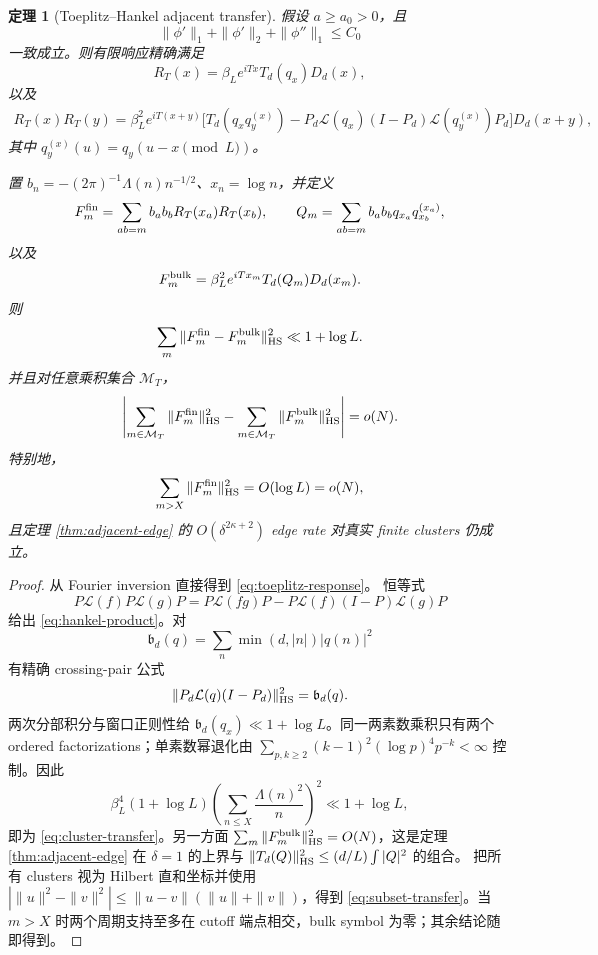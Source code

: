 \documentclass[UTF8,11pt,a4paper]{ctexart}
\newtheorem{theorem}{定理}[section]
\theoremstyle{definition}
\theoremstyle{remark}
\begin{document}
\begin{theorem}[Toeplitz--Hankel adjacent transfer]
\label{thm:toeplitz-adjacent}
假设 $a\ge a_0>0$，且
\[
 \|\phi'\|_1+\|\phi'\|_2+\|\phi''\|_1\le C_0
\]
一致成立。则有限响应精确满足
\[
 R_T(x)=\beta_Le^{iTx}T_d(q_x)D_d(x),
 \label{eq:toeplitz-response}
\]
以及
\[
 \begin{aligned}
 R_T(x)R_T(y)
 =\beta_L^2e^{iT(x+y)}
 \bigl[T_d(q_xq_y^{(x)})
 -P_d\mathcal L(q_x)(I-P_d)\mathcal L(q_y^{(x)})P_d\bigr]
 D_d(x+y),
 \end{aligned}
 \label{eq:hankel-product}
\]
其中 $q_y^{(x)}(u)=q_y(u-x\pmod L)$。

置 $b_n=-(2\pi)^{-1}\Lambda(n)n^{-1/2}$、$x_n=\log n$，并定义
\[
 F_m^{\rm fin}=\sum_{ab=m}b_ab_bR_T(x_a)R_T(x_b),
 \qquad
 Q_m=\sum_{ab=m}b_ab_bq_{x_a}q_{x_b}^{(x_a)},
\]
以及
\[
 F_m^{\rm bulk}
 =\beta_L^2e^{iTx_m}T_d(Q_m)D_d(x_m).
\]
则
\[
 \sum_m\|F_m^{\rm fin}-F_m^{\rm bulk}\|_{\rm HS}^2
 \ll1+\log L.
 \label{eq:cluster-transfer}
\]
并且对任意乘积集合 $\mathcal M_T$，
\[
 \left|
 \sum_{m\in\mathcal M_T}\|F_m^{\rm fin}\|_{\rm HS}^2
 -\sum_{m\in\mathcal M_T}\|F_m^{\rm bulk}\|_{\rm HS}^2
 \right|=o(N).
 \label{eq:subset-transfer}
\]
特别地，
\[
 \sum_{m>X}\|F_m^{\rm fin}\|_{\rm HS}^2=O(\log L)=o(N),
\]
且定理 \ref{thm:adjacent-edge} 的
$O(\delta^{2\kappa+2})$ edge rate 对真实 finite clusters 仍成立。
\end{theorem}

\begin{proof}
从 Fourier inversion 直接得到 \eqref{eq:toeplitz-response}。
恒等式
\[
 P\mathcal L(f)P\mathcal L(g)P
 =P\mathcal L(fg)P-P\mathcal L(f)(I-P)\mathcal L(g)P
\]
给出 \eqref{eq:hankel-product}。对
\[
 \mathfrak b_d(q)=\sum_n\min(d,|n|)|\widehat q(n)|^2
\]
有精确 crossing-pair 公式
\[
 \|P_d\mathcal L(q)(I-P_d)\|_{\rm HS}^2=\mathfrak b_d(q).
\]
两次分部积分与窗口正则性给
$\mathfrak b_d(q_x)\ll1+\log L$。同一两素数乘积只有两个 ordered
factorizations；单素数幂退化由
$\sum_{p,k\ge2}(k-1)^2(\log p)^4p^{-k}<\infty$ 控制。因此
\[
 \beta_L^4(1+\log L)
 \left(\sum_{n\le X}\frac{\Lambda(n)^2}{n}\right)^2
 \ll1+\log L,
\]
即为 \eqref{eq:cluster-transfer}。另一方面
$\sum_m\|F_m^{\rm bulk}\|_{\rm HS}^2=O(N)$，这是定理
\ref{thm:adjacent-edge} 在 $\delta=1$ 的上界与
$\|T_d(Q)\|_{\rm HS}^2\le(d/L)\int|Q|^2$ 的组合。
把所有 clusters 视为 Hilbert 直和坐标并使用
$|\|u\|^2-\|v\|^2|\le\|u-v\|(\|u\|+\|v\|)$，得到
\eqref{eq:subset-transfer}。当 $m>X$ 时两个周期支持至多在 cutoff
端点相交，bulk symbol 为零；其余结论随即得到。
\end{proof}
\end{document}
